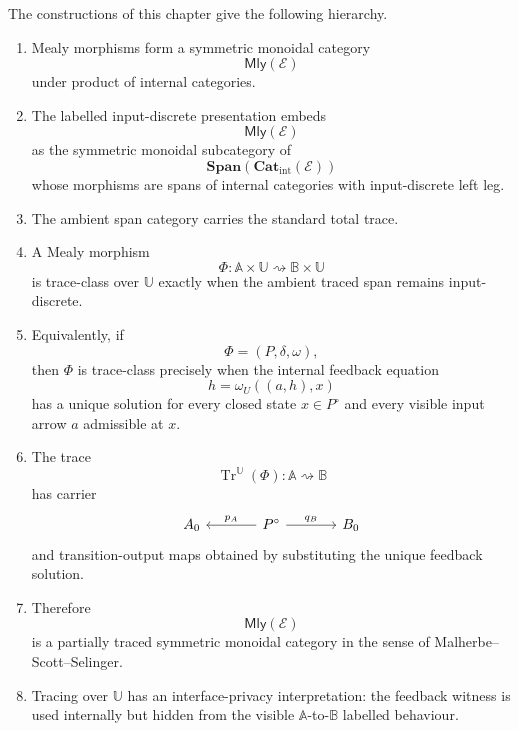 \begin{theorem}
\label{thm:partial-trace-main-consolidation}
The constructions of this chapter give the following hierarchy.

\begin{enumerate}
\item Mealy morphisms form a symmetric monoidal category
\[
\mathsf{Mly}(\mathcal E)
\]
under product of internal categories.

\item The labelled input-discrete presentation embeds
\[
\mathsf{Mly}(\mathcal E)
\]
as the symmetric monoidal subcategory of
\[
\mathbf{Span}(\mathbf{Cat}_{\mathrm{int}}(\mathcal E))
\]
whose morphisms are spans of internal categories with input-discrete left leg.

\item The ambient span category carries the standard total trace.

\item A Mealy morphism
\[
\Phi:\mathbb A\times\mathbb U
\rightsquigarrow
\mathbb B\times\mathbb U
\]
is trace-class over \(\mathbb U\) exactly when the ambient traced span remains
input-discrete.

\item Equivalently, if
\[
\Phi=(P,\delta,\omega),
\]
then \(\Phi\) is trace-class precisely when the internal feedback equation
\[
h=\omega_U((a,h),x)
\]
has a unique solution for every closed state \(x\in P^\circ\) and every
visible input arrow \(a\) admissible at \(x\).

\item The trace
\[
\operatorname{Tr}^{\mathbb U}(\Phi):
\mathbb A\rightsquigarrow\mathbb B
\]
has carrier
\[
\begin{tikzcd}[column sep=large]
A_0
&
P^\circ
  \arrow[l, "p_A"']
  \arrow[r, "q_B"]
&
B_0
\end{tikzcd}
\]
and transition-output maps obtained by substituting the unique feedback
solution.

\item Therefore
\[
\mathsf{Mly}(\mathcal E)
\]
is a partially traced symmetric monoidal category in the sense of
Malherbe--Scott--Selinger.

\item Tracing over \(\mathbb U\) has an interface-privacy interpretation: the
feedback witness is used internally but hidden from the visible
\(\mathbb A\)-to-\(\mathbb B\) labelled behaviour.


\end{enumerate}
\end{theorem}
